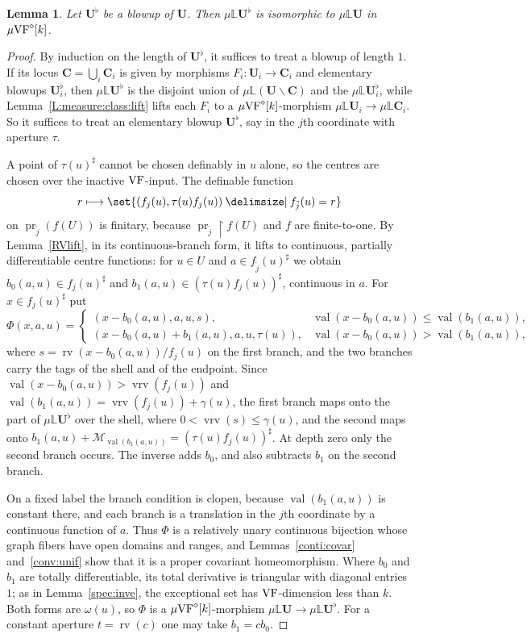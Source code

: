 \documentclass[12pt]{amsart}
\theoremstyle{plain}
\newtheorem{lem}[thm]{Lemma}
\theoremstyle{definition}
\theoremstyle{remark}
\numberwithin{equation}{section}
\theoremstyle{plain}
\newcommand{\VF}{\textup{VF}}
\newcommand{\MM}{\mdl M}
\DeclareMathOperator{\pr}{pr}
\newcommand{\0}{\emptyset}
\newcommand{\mdl}[1]{\mathcal{#1}}  %
\newcommand{\bb}[1]{\mathbb{#1}}
\newcommand{\rest}{\upharpoonright}
\newcommand{\fun}{\longrightarrow}
\newcommand{\efun}{\longmapsto}
\newcommand{\mi}{\smallsetminus}
\providecommand\given{}
\newcommand\SetSymbol[1][]{%
\nonscript \: #1 \vert
\allowbreak
\nonscript\:
\mathopen{}}
\renewcommand\given{\SetSymbol[\delimsize]}
\newcommand{\mVF}{{\mu}{\VF}}
\newcommand{\mL}{{\mu}{\bb L}}
\DeclareMathOperator{\rv}{rv}
\DeclareMathOperator{\vv}{val}
\DeclareMathOperator{\vrv}{vrv}
\begin{document}
\begin{lem}\label{blowup:same:RV:coa}
Let $\bm U^{\flat}$ be a blowup of $\bm U$. Then $\mL \bm U^{\flat}$ is isomorphic to $\mL \bm U$ in $\mVF^{\diamond}[k]$.
\end{lem}
\begin{proof}
By induction on the length of $\bm U^{\flat}$, it suffices to treat a blowup of length $1$. If its locus $\bm C = \bigcup_i \bm C_i$ is given by morphisms $F_i : \bm U_i \fun \bm C_i$ and elementary blowups $\bm U_i^\flat$, then $\mL \bm U^\flat$ is the disjoint union of $\mL(\bm U \mi \bm C)$ and the $\mL \bm U_i^\flat$, while Lemma~\ref{L:measure:class:lift} lifts each $F_i$ to a $\mVF^\diamond[k]$-morphism $\mL \bm U_i \fun \mL \bm C_i$. So it suffices to treat an elementary blowup $\bm U^\flat$, say in the $j$th coordinate with aperture $\tau$.

A point of $\tau(u)^\sharp$ cannot be chosen definably in $u$ alone, so the centres are chosen over the inactive $\VF$-input. The definable function
\[
r \efun \set{(f_j(u), \tau(u) f_j(u)) \given f_{\tilde j}(u) = r}
\]
on $\pr_{\tilde j}(f(U))$ is finitary, because $\pr_{\tilde j} \rest f(U)$ and $f$ are finite-to-one. By Lemma~\ref{RVlift}, in its continuous-branch form, it lifts to continuous, partially differentiable centre functions: for $u \in U$ and $a \in f_{\tilde j}(u)^\sharp$ we obtain $b_0(a, u) \in f_j(u)^\sharp$ and $b_1(a, u) \in (\tau(u) f_j(u))^\sharp$, continuous in $a$. For $x \in f_j(u)^\sharp$ put
\[
\Phi(x, a, u) =
\begin{cases}
(x - b_0(a, u), a, u, s), & \vv(x - b_0(a, u)) \leq \vv(b_1(a, u)),\\
(x - b_0(a, u) + b_1(a, u), a, u, \tau(u)), & \vv(x - b_0(a, u)) > \vv(b_1(a, u)),
\end{cases}
\]
where $s = \rv(x - b_0(a, u)) / f_j(u)$ on the first branch, and the two branches carry the tags of the shell and of the endpoint. Since $\vv(x - b_0(a, u)) > \vrv(f_j(u))$ and $\vv(b_1(a, u)) = \vrv(f_j(u)) + \gamma(u)$, the first branch maps onto the part of $\mL \bm U^\flat$ over the shell, where $0 < \vrv(s) \leq \gamma(u)$, and the second maps onto $b_1(a, u) + \MM_{\vv(b_1(a, u))} = (\tau(u) f_j(u))^\sharp$. At depth zero only the second branch occurs. The inverse adds $b_0$, and also subtracts $b_1$ on the second branch.

On a fixed label the branch condition is clopen, because $\vv(b_1(a, u))$ is constant there, and each branch is a translation in the $j$th coordinate by a continuous function of $a$. Thus $\Phi$ is a relatively unary continuous bijection whose graph fibers have open domains and ranges, and Lemmas~\ref{conti:covar} and~\ref{conv:unif} show that it is a proper covariant homeomorphism. Where $b_0$ and $b_1$ are totally differentiable, its total derivative is triangular with diagonal entries $1$; as in Lemma~\ref{spec:inve}, the exceptional set has $\VF$-dimension less than $k$. Both forms are $\omega(u)$, so $\Phi$ is a $\mVF^\diamond[k]$-morphism $\mL \bm U \fun \mL \bm U^\flat$. For a constant aperture $t = \rv(c)$ one may take $b_1 = c b_0$.
\end{proof}
\end{document}
